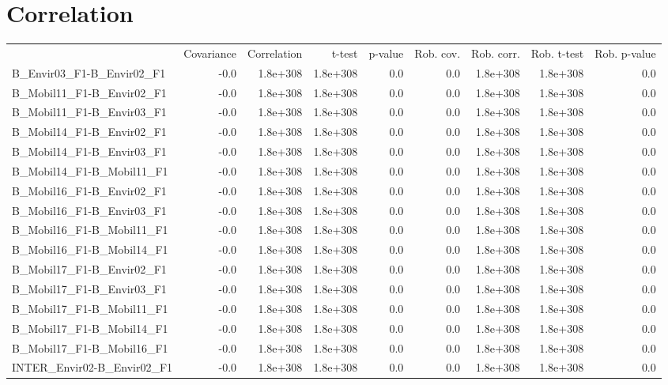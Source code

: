 \section{Correlation}
\begin{tabular}{lrrrrrrrr}
 & Covariance & Correlation & t-test & p-value & Rob. cov. & Rob. corr. & Rob. t-test & Rob. p-value \\
B_Envir03_F1-B_Envir02_F1 & -0.0 & 1.8e+308 & 1.8e+308 & 0.0 & 0.0 & 1.8e+308 & 1.8e+308 & 0.0 \\
B_Mobil11_F1-B_Envir02_F1 & -0.0 & 1.8e+308 & 1.8e+308 & 0.0 & 0.0 & 1.8e+308 & 1.8e+308 & 0.0 \\
B_Mobil11_F1-B_Envir03_F1 & -0.0 & 1.8e+308 & 1.8e+308 & 0.0 & 0.0 & 1.8e+308 & 1.8e+308 & 0.0 \\
B_Mobil14_F1-B_Envir02_F1 & -0.0 & 1.8e+308 & 1.8e+308 & 0.0 & 0.0 & 1.8e+308 & 1.8e+308 & 0.0 \\
B_Mobil14_F1-B_Envir03_F1 & -0.0 & 1.8e+308 & 1.8e+308 & 0.0 & 0.0 & 1.8e+308 & 1.8e+308 & 0.0 \\
B_Mobil14_F1-B_Mobil11_F1 & -0.0 & 1.8e+308 & 1.8e+308 & 0.0 & 0.0 & 1.8e+308 & 1.8e+308 & 0.0 \\
B_Mobil16_F1-B_Envir02_F1 & -0.0 & 1.8e+308 & 1.8e+308 & 0.0 & 0.0 & 1.8e+308 & 1.8e+308 & 0.0 \\
B_Mobil16_F1-B_Envir03_F1 & -0.0 & 1.8e+308 & 1.8e+308 & 0.0 & 0.0 & 1.8e+308 & 1.8e+308 & 0.0 \\
B_Mobil16_F1-B_Mobil11_F1 & -0.0 & 1.8e+308 & 1.8e+308 & 0.0 & 0.0 & 1.8e+308 & 1.8e+308 & 0.0 \\
B_Mobil16_F1-B_Mobil14_F1 & -0.0 & 1.8e+308 & 1.8e+308 & 0.0 & 0.0 & 1.8e+308 & 1.8e+308 & 0.0 \\
B_Mobil17_F1-B_Envir02_F1 & -0.0 & 1.8e+308 & 1.8e+308 & 0.0 & 0.0 & 1.8e+308 & 1.8e+308 & 0.0 \\
B_Mobil17_F1-B_Envir03_F1 & -0.0 & 1.8e+308 & 1.8e+308 & 0.0 & 0.0 & 1.8e+308 & 1.8e+308 & 0.0 \\
B_Mobil17_F1-B_Mobil11_F1 & -0.0 & 1.8e+308 & 1.8e+308 & 0.0 & 0.0 & 1.8e+308 & 1.8e+308 & 0.0 \\
B_Mobil17_F1-B_Mobil14_F1 & -0.0 & 1.8e+308 & 1.8e+308 & 0.0 & 0.0 & 1.8e+308 & 1.8e+308 & 0.0 \\
B_Mobil17_F1-B_Mobil16_F1 & -0.0 & 1.8e+308 & 1.8e+308 & 0.0 & 0.0 & 1.8e+308 & 1.8e+308 & 0.0 \\
INTER_Envir02-B_Envir02_F1 & -0.0 & 1.8e+308 & 1.8e+308 & 0.0 & 0.0 & 1.8e+308 & 1.8e+308 & 0.0 \\

\end{tabular}
